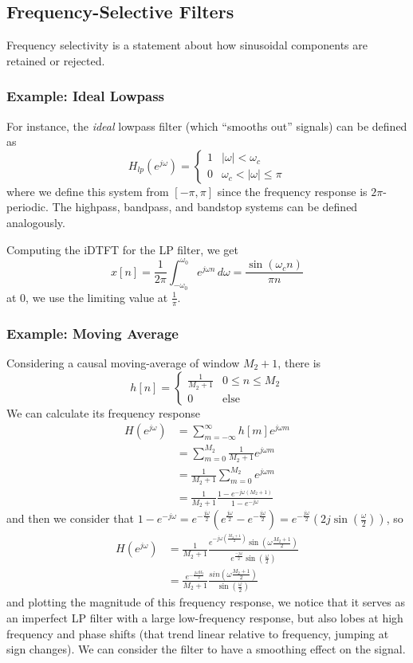 \documentclass{article}
\newcommand{\jw}{{j\omega}}
\newcommand{\w}{\omega}
\begin{document}
\subsection{Frequency-Selective Filters}
Frequency selectivity is a statement about how sinusoidal components are retained or rejected.

\subsubsection{Example: Ideal Lowpass}
For instance, the \textit{ideal} lowpass filter (which ``smooths out'' signals) can be defined as
\[
    H_{lp}(e^{j\omega}) = \begin{cases}
        1 & |\omega| < \omega_c\\
        0 & \omega_c< |\w| \le \pi
    \end{cases}
\]
where we define this system from $[-\pi,\pi]$ since the frequency response is $2\pi$-periodic.
The highpass, bandpass, and bandstop systems can be defined analogously.

Computing the iDTFT for the LP filter, we get
\[
    x[n] = \frac{1}{2\pi} \int_{-\w_0}^{\w_0} e^{\jw n}\, d\omega= \frac{\sin(\w_cn)}{\pi n}
\]
at $0$, we use the limiting value at $\frac{1}{\pi}$.

\subsubsection{Example: Moving Average}
Considering a causal moving-average of window $M_2+1$, there is
\[
    h[n] = \begin{cases}
        \frac{1}{M_2+1} &  0\le n \le M_2\\
        0 & \textrm{else}
    \end{cases}
\]
We can calculate its frequency response
\begin{align*}
	H(e^\jw)&=\sum_{m=-\infty}^\infty h[m] e^{\jw m}\\
	    &= \sum_{m=0}^{M_2} \frac{1}{M_2+1} e^{\jw m}\\
	    &= \frac{1}{M_2+1}\sum_{m=0}^{M_2}  e^{\jw m}\\
	    &= \frac{1}{M_2+1} \frac{1-e^{-\jw\left(M_2+1\right)}}{1-e^{-\jw}}
\end{align*}
and then we consider that $1-e^{-\jw} = e^{-\frac{\jw}{2}}\left(e^\frac{\jw}{2}-e^{-\frac{\jw}{2}}\right) = e^{-\frac{\jw}{2}}\left(2j\sin(\frac{\w}{2})\right)$, so
\begin{align*}
	H(e^\jw)
	&=\frac{1}{M_2+1}\frac{
	    e^{-\jw\left(\frac{M_2+1}{2}\right)}\sin(\w\frac{M_2+1}{2})
	}{
	    e^{\frac{-\jw}{2}}\sin(\frac{\w}{2})
	}\\
	&=\frac{
	    e^{-\frac{\jw M_2}{2}}
	}{M_2+1} \frac{
	    sin(\w\frac{M_2+1}{2})
	}{
	    \sin(\frac{\w}{2})
	}
\end{align*}
and plotting the magnitude of this frequency response, we notice that it serves as an imperfect LP filter with a large low-frequency response, but also lobes at high frequency and phase shifts (that trend linear relative to frequency, jumping at sign changes). We can consider the filter to have a smoothing effect on the signal.
\end{document}
